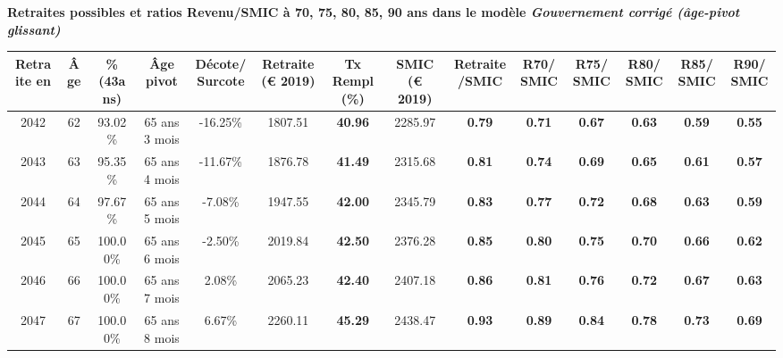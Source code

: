  \vspace{0.1cm} 
{\bf \noindent Retraites possibles et ratios Revenu/SMIC à 70, 75, 80, 85, 90 ans dans le modèle \emph{Gouvernement corrigé (âge-pivot glissant)}}  
 
\begin{adjustbox}{max width=\textwidth} 
\begin{tabular}[htb]{|c|c||c|c|c||c|c||c|c||c|c|c|c|c|} 
\hline 
 Retraite en &  Âge &  \%(43ans) &  Âge pivot &  Décote/Surcote &  Retraite (\euro{} 2019) &  Tx Rempl(\%) &  SMIC (\euro{} 2019) &  Retraite/SMIC &  R70/SMIC &  R75/SMIC &  R80/SMIC &  R85/SMIC &  R90/SMIC \\ 
\hline \hline 
 2042 &  62 &  93.02\% &  65 ans 3 mois &  -16.25\% &  1807.51 &  {\bf 40.96} &  2285.97 &  {\bf {\color{red} 0.79}} &  {\bf {\color{red} 0.71}} &  {\bf {\color{red} 0.67}} &  {\bf {\color{red} 0.63}} &  {\bf {\color{red} 0.59}} &  {\bf {\color{red} 0.55}} \\ 
\hline 
 2043 &  63 &  95.35\% &  65 ans 4 mois &  -11.67\% &  1876.78 &  {\bf 41.49} &  2315.68 &  {\bf {\color{red} 0.81}} &  {\bf {\color{red} 0.74}} &  {\bf {\color{red} 0.69}} &  {\bf {\color{red} 0.65}} &  {\bf {\color{red} 0.61}} &  {\bf {\color{red} 0.57}} \\ 
\hline 
 2044 &  64 &  97.67\% &  65 ans 5 mois &  -7.08\% &  1947.55 &  {\bf 42.00} &  2345.79 &  {\bf {\color{red} 0.83}} &  {\bf {\color{red} 0.77}} &  {\bf {\color{red} 0.72}} &  {\bf {\color{red} 0.68}} &  {\bf {\color{red} 0.63}} &  {\bf {\color{red} 0.59}} \\ 
\hline 
 2045 &  65 &  100.00\% &  65 ans 6 mois &  -2.50\% &  2019.84 &  {\bf 42.50} &  2376.28 &  {\bf {\color{red} 0.85}} &  {\bf {\color{red} 0.80}} &  {\bf {\color{red} 0.75}} &  {\bf {\color{red} 0.70}} &  {\bf {\color{red} 0.66}} &  {\bf {\color{red} 0.62}} \\ 
\hline 
 2046 &  66 &  100.00\% &  65 ans 7 mois &  2.08\% &  2065.23 &  {\bf 42.40} &  2407.18 &  {\bf {\color{red} 0.86}} &  {\bf {\color{red} 0.81}} &  {\bf {\color{red} 0.76}} &  {\bf {\color{red} 0.72}} &  {\bf {\color{red} 0.67}} &  {\bf {\color{red} 0.63}} \\ 
\hline 
 2047 &  67 &  100.00\% &  65 ans 8 mois &  6.67\% &  2260.11 &  {\bf 45.29} &  2438.47 &  {\bf {\color{red} 0.93}} &  {\bf {\color{red} 0.89}} &  {\bf {\color{red} 0.84}} &  {\bf {\color{red} 0.78}} &  {\bf {\color{red} 0.73}} &  {\bf {\color{red} 0.69}} \\ 
\hline 
\hline 
\end{tabular} 
\end{adjustbox} 
 

